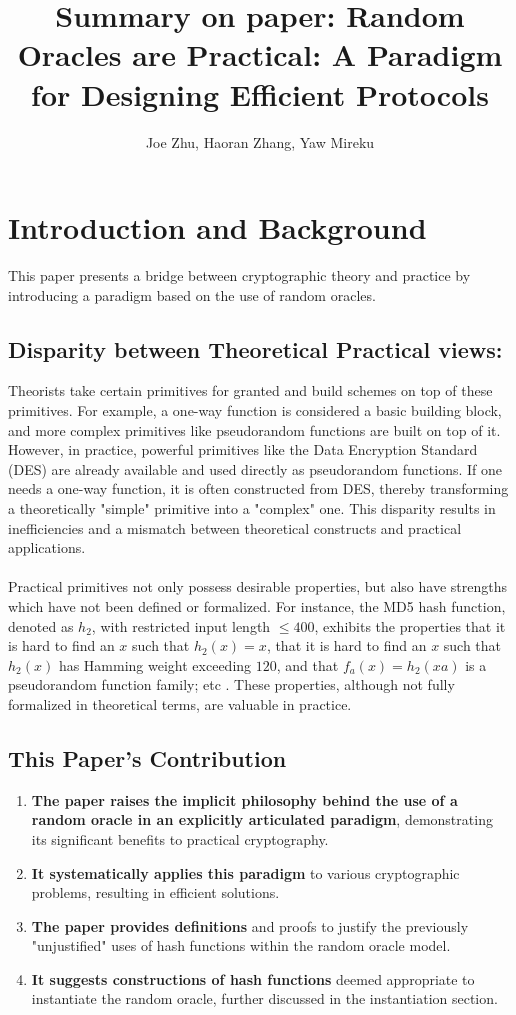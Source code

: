 \documentclass{article}
\title{Summary on paper: Random Oracles are Practical: A Paradigm for Designing Efficient Protocols \cite{10.1145/168588.168596}}
\author{Joe Zhu, Haoran Zhang, Yaw Mireku}
\begin{document}
\maketitle

\section{Introduction and Background}

This paper presents a bridge between cryptographic theory and practice by introducing a paradigm based on the use of random oracles. 

\subsection{Disparity between Theoretical Practical views:}
Theorists take certain primitives for granted and build schemes on top of these primitives. For example, a one-way function is considered a basic building block, and more complex primitives like pseudorandom functions are built on top of it. However, in practice, powerful primitives like the Data Encryption Standard (DES) are already available and used directly as pseudorandom functions. If one needs a one-way function, it is often constructed from DES, thereby transforming a theoretically "simple" primitive into a "complex" one. This disparity results in inefficiencies and a mismatch between theoretical constructs and practical applications. 
\\\\
Practical primitives not only possess desirable properties, but also have strengths which have not been defined or formalized. For instance, the MD5 hash function, denoted as $h_2$, with restricted input length $\leq 400$, exhibits the properties that it is hard to find an $x$ such that $h_2(x) = x$, that it is hard to find an $x$ such that $h_2(x)$ has Hamming weight exceeding $120$, and that $f_a(x) = h_2(xa)$ is a pseudorandom function family; etc \cite{10.1145/288090.288106}. These properties, although not fully formalized in theoretical terms, are valuable in practice.

\subsection{This Paper's Contribution}
\begin{enumerate}
    \item \textbf{The paper raises the implicit philosophy behind the use of a random oracle in an explicitly articulated paradigm}, demonstrating its significant benefits to practical cryptography.
    \item \textbf{It systematically applies this paradigm} to various cryptographic problems, resulting in efficient solutions.
    \item \textbf{The paper provides definitions} and proofs to justify the previously "unjustified" uses of hash functions within the random oracle model.
    \item \textbf{It suggests constructions of hash functions} deemed appropriate to instantiate the random oracle, further discussed in the instantiation section.
\end{enumerate}
\end{document}
